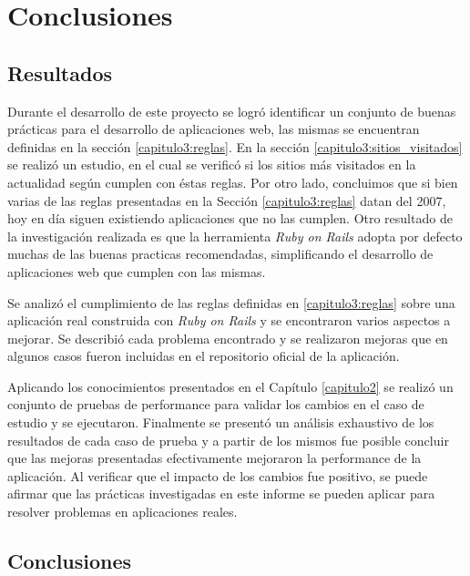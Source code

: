 \chapter{Conclusiones}


\section{Resultados}

Durante el desarrollo de este proyecto se logró identificar un conjunto de buenas prácticas para el desarrollo de aplicaciones web, las mismas se encuentran definidas en la sección 
\ref{capitulo3:reglas}. En la sección \ref{capitulo3:sitios_visitados} se realizó un estudio, en el cual se verificó si los sitios más visitados en la actualidad según \cite{alexa} cumplen 
con éstas reglas. Por otro lado, concluimos que si bien varias de las reglas presentadas en la Sección \ref{capitulo3:reglas} datan del 2007, hoy en día siguen existiendo aplicaciones que no las cumplen. Otro resultado de la investigación realizada es que la herramienta \emph{Ruby on Rails} adopta por defecto muchas de las buenas practicas recomendadas,
simplificando el desarrollo de aplicaciones web que cumplen con las mismas.

Se analizó el cumplimiento de las reglas definidas en \ref{capitulo3:reglas} sobre una aplicación real construida con \emph{Ruby on Rails} y se encontraron varios aspectos a mejorar. Se 
describió cada problema encontrado y se realizaron mejoras que en algunos casos fueron incluidas en el repositorio oficial de la aplicación.

Aplicando los conocimientos presentados en el Capítulo \ref{capitulo2} se realizó un conjunto de pruebas de performance para validar los cambios en el caso de estudio y se
ejecutaron. Finalmente se presentó un análisis exhaustivo de los resultados de cada caso de prueba y a partir de los mismos fue posible concluir que las mejoras presentadas efectivamente mejoraron la performance de la aplicación. Al verificar que el impacto de los cambios fue positivo, se puede afirmar que las prácticas investigadas en este informe
se pueden aplicar para resolver problemas en aplicaciones reales.

\section{Conclusiones}

